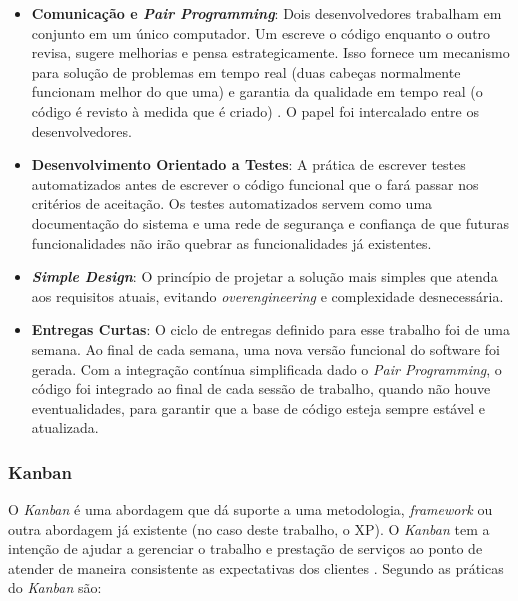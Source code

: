 \begin{itemize}
    \item \textbf{Comunicação e \textit{Pair Programming}}:
    Dois desenvolvedores trabalham em conjunto em um único computador. Um escreve o código  enquanto o outro revisa, sugere melhorias e pensa estrategicamente. Isso fornece um mecanismo para solução de problemas em tempo real (duas cabeças normalmente funcionam melhor do que uma) e garantia da qualidade em tempo real (o código é revisto à medida que é criado) \cite{pressman2021engenharia}. O papel foi intercalado entre os desenvolvedores.

    \item \textbf{Desenvolvimento Orientado a Testes}:
    A prática de escrever testes automatizados antes de escrever o código funcional que o fará passar nos critérios de aceitação. Os testes automatizados servem como uma documentação do sistema e uma rede de segurança e confiança de que futuras funcionalidades não irão quebrar as funcionalidades já existentes.

    \item \textbf{\textit{Simple Design}}:
    O princípio de projetar a solução mais simples que atenda aos requisitos atuais, evitando \textit{overengineering} e complexidade desnecessária.

    \item \textbf{Entregas Curtas}:
    O ciclo de entregas definido para esse trabalho foi de uma semana. Ao final de cada semana, uma nova versão funcional do software foi gerada. Com a integração contínua simplificada dado o \textit{Pair Programming}, o código foi integrado ao final de cada sessão de trabalho, quando não houve eventualidades, para garantir que a base de código esteja sempre estável e atualizada.
\end{itemize}

\subsubsection[Kanban]{Kanban}
O \textit{Kanban} é uma abordagem que dá suporte a uma metodologia, \textit{framework} ou outra abordagem já existente (no caso deste trabalho, o XP). O \textit{Kanban} tem a intenção de ajudar a gerenciar o trabalho e prestação de serviços ao ponto de atender de maneira consistente as expectativas dos clientes \cite{Bartel2021}.
Segundo  as práticas do \textit{Kanban} são:

